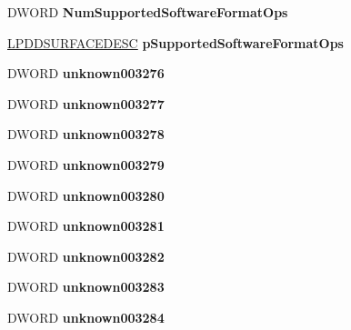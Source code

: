 \begin{DoxyCompactItemize}
D\+W\+O\+RD {\bfseries Num\+Supported\+Software\+Format\+Ops}
\item 
\mbox{\label{struct___d_i_r_e_c_t3_d9___i_n_t_a96bfbc26fed7c1d8409b0fbddb52a086}} 
\hyperlink{interfacevoid}{L\+P\+D\+D\+S\+U\+R\+F\+A\+C\+E\+D\+E\+SC} {\bfseries p\+Supported\+Software\+Format\+Ops}
\item 
\mbox{\label{struct___d_i_r_e_c_t3_d9___i_n_t_a866599184324bab6e937cf78d14b02fe}} 
D\+W\+O\+RD {\bfseries unknown003276}
\item 
\mbox{\label{struct___d_i_r_e_c_t3_d9___i_n_t_ab1f8ecc2c90b5607e1b9ae524ba2fc32}} 
D\+W\+O\+RD {\bfseries unknown003277}
\item 
\mbox{\label{struct___d_i_r_e_c_t3_d9___i_n_t_ae7286306edde4000193d68146bc2ab68}} 
D\+W\+O\+RD {\bfseries unknown003278}
\item 
\mbox{\label{struct___d_i_r_e_c_t3_d9___i_n_t_ab057bc6a404bb7273983c45483134c58}} 
D\+W\+O\+RD {\bfseries unknown003279}
\item 
\mbox{\label{struct___d_i_r_e_c_t3_d9___i_n_t_addc101bc176d48bb15d45630f3108060}} 
D\+W\+O\+RD {\bfseries unknown003280}
\item 
\mbox{\label{struct___d_i_r_e_c_t3_d9___i_n_t_aff648b7daa1c55c57d1e4dad516b2a4e}} 
D\+W\+O\+RD {\bfseries unknown003281}
\item 
\mbox{\label{struct___d_i_r_e_c_t3_d9___i_n_t_a885ab8ac65ec1a96aaa2d36166097b0e}} 
D\+W\+O\+RD {\bfseries unknown003282}
\item 
\mbox{\label{struct___d_i_r_e_c_t3_d9___i_n_t_a95488d04bfc1e7ea565d530c0a056c4b}} 
D\+W\+O\+RD {\bfseries unknown003283}
\item 
\mbox{\label{struct___d_i_r_e_c_t3_d9___i_n_t_a26ce9f7e21932ebb83b23d114b15b7dd}} 
D\+W\+O\+RD {\bfseries unknown003284}

\end{DoxyCompactItemize}
